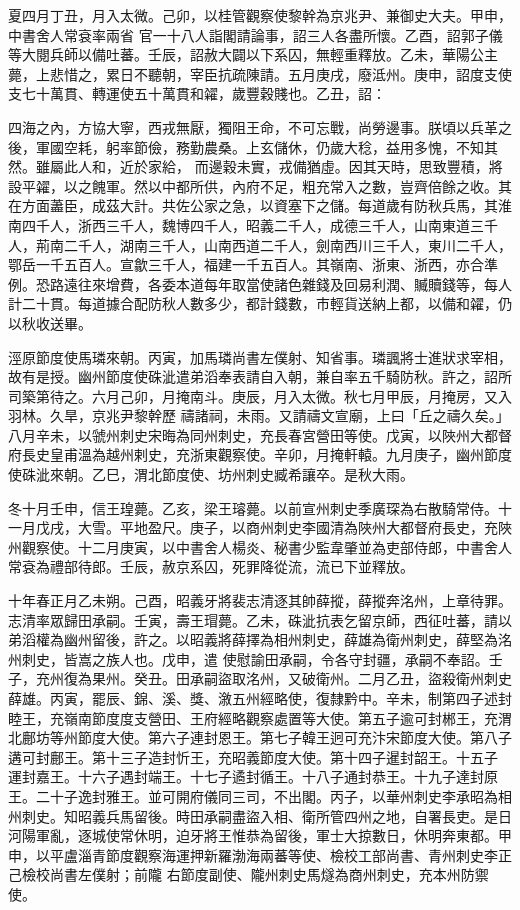 \begin{pinyinscope}
 夏四月丁丑，月入太微。己卯，以桂管觀察使黎幹為京兆尹、兼御史大夫。甲申，中書舍人常袞率兩省
 官一十八人詣閣請論事，詔三人各盡所懷。乙酉，詔郭子儀等大閱兵師以備吐蕃。壬辰，詔赦大闢以下系囚，無輕重釋放。乙未，華陽公主薨，上悲惜之，累日不聽朝，宰臣抗疏陳請。五月庚戌，廢泜州。庚申，詔度支使支七十萬貫、轉運使五十萬貫和糴，歲豐穀賤也。乙丑，詔：



 四海之內，方協大寧，西戎無厭，獨阻王命，不可忘戰，尚勞邊事。朕頃以兵革之後，軍國空耗，躬率節儉，務勤農桑。上玄儲休，仍歲大稔，益用多愧，不知其然。雖屬此人和，近於家給，
 而邊穀未實，戎備猶虛。因其天時，思致豐積，將設平糴，以之餽軍。然以中都所供，內府不足，粗充常入之數，豈齊倍餘之收。其在方面藎臣，成茲大計。共佐公家之急，以資塞下之儲。每道歲有防秋兵馬，其淮南四千人，浙西三千人，魏博四千人，昭義二千人，成德三千人，山南東道三千人，荊南二千人，湖南三千人，山南西道二千人，劍南西川三千人，東川二千人，鄂岳一千五百人。宣歙三千人，福建一千五百人。其嶺南、浙東、浙西，亦合準
 例。恐路遠往來增費，各委本道每年取當使諸色雜錢及回易利潤、贓贖錢等，每人計二十貫。每道據合配防秋人數多少，都計錢數，市輕貨送納上都，以備和糴，仍以秋收送畢。



 涇原節度使馬璘來朝。丙寅，加馬璘尚書左僕射、知省事。璘諷將士進狀求宰相，故有是授。幽州節度使硃泚遣弟滔奉表請自入朝，兼自率五千騎防秋。許之，詔所司築第待之。六月己卯，月掩南斗。庚辰，月入太微。秋七月甲辰，月掩房，又入羽林。久旱，京兆尹黎幹歷
 禱諸祠，未雨。又請禱文宣廟，上曰「丘之禱久矣。」八月辛未，以虢州刺史宋晦為同州刺史，充長春宮營田等使。戊寅，以陜州大都督府長史皇甫溫為越州剌史，充浙東觀察使。辛卯，月掩軒轅。九月庚子，幽州節度使硃泚來朝。乙巳，渭北節度使、坊州刺史臧希讓卒。是秋大雨。



 冬十月壬申，信王瑝薨。乙亥，梁王璿薨。以前宣州刺史季廣琛為右散騎常侍。十一月戊戌，大雪。平地盈尺。庚子，以商州刺史李國清為陜州大都督府長史，充陜
 州觀察使。十二月庚寅，以中書舍人楊炎、秘書少監韋肇並為吏部侍郎，中書舍人常袞為禮部待郎。壬辰，赦京系囚，死罪降從流，流已下並釋放。



 十年春正月乙未朔。己酉，昭義牙將裴志清逐其帥薛摐，薛摐奔洺州，上章待罪。志清率眾歸田承嗣。壬寅，壽王瑁薨。乙未，硃泚抗表乞留京師，西征吐蕃，請以弟滔權為幽州留後，許之。以昭義將薛擇為相州刺史，薛雄為衛州刺史，薛堅為洺州刺史，皆嵩之族人也。戊申，遣
 使慰諭田承嗣，令各守封疆，承嗣不奉詔。壬子，充州復為果州。癸丑。田承嗣盜取洺州，又破衛州。二月乙丑，盜殺衛州刺史薛雄。丙寅，罷辰、錦、溪、獎、漵五州經略使，復隸黔中。辛未，制第四子述封睦王，充嶺南節度度支營田、王府經略觀察處置等大使。第五子逾可封郴王，充渭北鄜坊等州節度大使。第六子連封恩王。第七子韓王迥可充汴宋節度大使。第八子遘可封鄜王。第十三子造封忻王，充昭義節度大使。第十四子暹封韶王。十五子
 運封嘉王。十六子遇封端王。十七子遹封循王。十八子通封恭王。十九子達封原王。二十子逸封雅王。並可開府儀同三司，不出閣。丙子，以華州刺史李承昭為相州刺史。知昭義兵馬留後。時田承嗣盡盜入相、衛所管四州之地，自署長吏。是日河陽軍亂，逐城使常休明，迫牙將王惟恭為留後，軍士大掠數日，休明奔東都。甲申，以平盧淄青節度觀察海運押新羅渤海兩蕃等使、檢校工部尚書、青州刺史李正己檢校尚書左僕射；前隴
 右節度副使、隴州刺史馬燧為商州刺史，充本州防禦使。




\end{pinyinscope}
